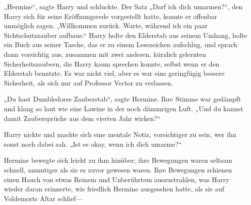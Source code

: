 „Hermine“, sagte Harry und schluckte. Der Satz „Darf ich dich umarmen?“, den Harry sich für seine Eröffnungsrede vorgestellt hatte, konnte er offenbar unmöglich sagen. „Willkommen zurück. Warte, während ich ein paar Sichtschutzzauber aufbaue.“
Harry holte den Elderstab aus seinem Umhang, holte ein Buch aus seiner Tasche, das er zu einem Lesezeichen aufschlug, und sprach dann vorsichtig  aus, zusammen mit zwei anderen, kürzlich gelernten Sicherheitszaubern, die Harry kaum sprechen konnte, selbst wenn er den Elderstab benutzte. Es war nicht viel, aber es war eine geringfügig bessere Sicherheit, als sich nur auf Professor Vector zu verlassen.

„Du hast Dumbledores Zauberstab“, sagte Hermine. Ihre Stimme war gedämpft und klang so laut wie eine Lawine in der noch dämmrigen Luft. „Und du kannst damit Zaubersprüche aus dem vierten Jahr wirken?“

Harry nickte und machte sich eine mentale Notiz, vorsichtiger zu sein, wer ihn sonst noch dabei sah.
„Ist es okay, wenn ich dich umarme?“

Hermine bewegte sich leicht zu ihm hinüber; ihre Bewegungen waren seltsam schnell, anmutiger als sie es zuvor gewesen waren. Ihre Bewegungen schienen einen Hauch von etwas Reinem und Unberührtem auszustrahlen, was Harry wieder daran erinnerte, wie friedlich Hermine ausgesehen hatte, als sie auf Voldemorts Altar schlief—

